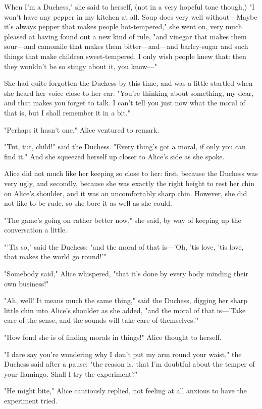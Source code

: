 When I'm a Duchess," she said to herself, (not in a very hopeful tone though,) "I won't have any pepper in my kitchen at all. Soup does very well without—Maybe it's always pepper ​that makes people hot-tempered," she went on, very much pleased at having found out a new kind of rule, "and vinegar that makes them sour—and camomile that makes them bitter—and—and barley-sugar and such things that make children sweet-tempered. I only wish people knew that: then they wouldn't be so stingy about it, you know—"

She had quite forgotten the Duchess by this time, and was a little startled when she heard her voice close to her ear. "You're thinking about something, my dear, and that makes you forget to talk. I can't tell you just now what the moral of that is, but I shall remember it in a bit."

"Perhaps it hasn't one," Alice ventured to remark.

"Tut, tut, child!" said the Duchess. "Every thing's got a moral, if only you can find it." And she squeezed herself up closer to Alice's side as she spoke.

Alice did not much like her keeping so close ​to her: first, because the Duchess was very ugly, and secondly, because she was exactly the right height to rest her chin on Alice's shoulder, and it was an uncomfortably sharp chin. However, she did not like to be rude, so she bore it as well as she could.

"The game's going on rather better now," she said, by way of keeping up the conversation a little.

"'Tis so," said the Duchess: "and the moral of that is—'Oh, 'tis love, 'tis love, that makes the world go round!'"

"Somebody said," Alice whispered, "that it's done by every body minding their own business!"

​"Ah, well! It means much the same thing," said the Duchess, digging her sharp little chin into Alice's shoulder as she added, "and the moral of that is—'Take care of the sense, and the sounds will take care of themselves.'"

"How fond she is of finding morals in things!" Alice thought to herself.

"I dare say you're wondering why I don't put my arm round your waist," the Duchess said after a pause: "the reason is, that I'm doubtful about the temper of your flamingo. Shall I try the experiment?"

"He might bite," Alice cautiously replied, not feeling at all anxious to have the experiment tried.

